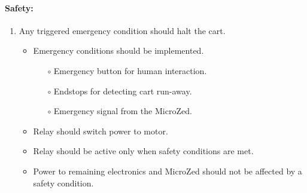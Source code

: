 \paragraph{Safety:}
\begin{enumerate}[resume]
	\item Any triggered emergency condition should halt the cart.
	\label{enum:any_trigger_em}
		\begin{itemize}
			\item Emergency conditions should be implemented.
			\begin{itemize}
				\item[$\circ$] Emergency button for human interaction.
				\item[$\circ$] Endstops for detecting cart run-away.
				\item[$\circ$] Emergency signal from the MicroZed.
			\end{itemize}
			\item Relay should switch power to motor.
			\item Relay should be active only when safety conditions are met.
			\item Power to remaining electronics and MicroZed should not be affected by a safety condition.
		\end{itemize}
\end{enumerate}
